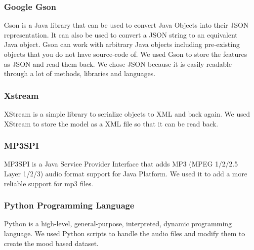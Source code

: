 \subsubsection{Google Gson}

Gson is a Java library that can be used to convert Java Objects into their JSON representation. 
It can also be used to convert a JSON string to an equivalent Java object. 
Gson can work with arbitrary Java objects including pre-existing objects that you do not have source-code of.  
We used Gson to store the features as JSON and read them back. 
We chose JSON because it is easily readable through a lot of methods, libraries and languages.

\subsubsection{Xstream}

XStream is a simple library to serialize objects to XML and back again.
We used XStream to store the model as a XML file so that it can be read back. 

\subsubsection{MP3SPI}
MP3SPI is a Java Service Provider Interface that adds MP3 (MPEG 1/2/2.5 Layer 1/2/3) audio format support for Java Platform.
We used it to add a more reliable support for mp3 files.

\subsubsection{Python Programming Language}

Python is a high-level, general-purpose, interpreted, dynamic programming language.
We used Python scripts to handle the audio files and modify them to create the mood based dataset.

